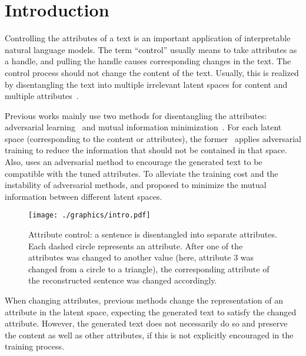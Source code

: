 \documentclass[11pt,a4paper]{article}
\renewcommand{\cite}{\citep}
\begin{document}
\section{Introduction}
Controlling the attributes of a text is an important application of interpretable natural language models. The term  ``control'' usually means to take attributes as a handle, and pulling the handle causes corresponding changes in the text. The control process should not change the content of the text. Usually, this is realized by disentangling the text into  multiple irrelevant latent spaces for content and multiple attributes~\cite{sha2021multi}. 


Previous works mainly use two methods for disentangling the attributes: adversarial learning~\cite{chen2016infogan,john-etal-2019-disentangled} and mutual information minimization~\cite{moyer2018invariant,sha2021multi}. For each latent space (corresponding to the content or attributes), the former~\cite{john-etal-2019-disentangled} applies adversarial training  to reduce  the  information that should not be contained in that space. Also,  uses an adversarial method to encourage the generated text to be compatible with the tuned attributes. To alleviate the training cost and the instability of adversarial methods,  and  proposed to minimize the mutual information between different latent spaces. 


\begin{figure}[!t]
    \centering
    \texttt{[image: ./graphics/intro.pdf]}\\
    \caption{Attribute control: a sentence is disentangled into separate attributes. Each dashed circle represents an attribute. After one of the attributes was changed to another value (here, attribute 3 was changed from a circle to a triangle), the corresponding attribute of the reconstructed sentence was changed accordingly.}
    \label{fig:intro}
\end{figure}

When changing attributes, previous methods change the representation of an attribute in the latent space, expecting the generated text to satisfy the changed attribute. However,  the generated text  does not necessarily do so and preserve the content as well as other attributes, if this is not explicitly encouraged  in the training process. 
  
\end{document}
